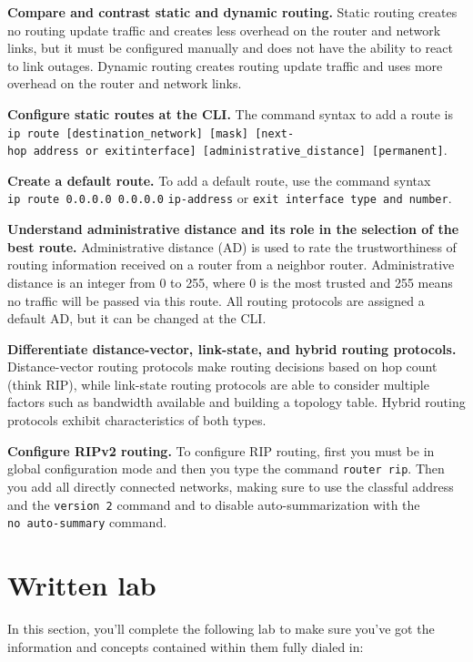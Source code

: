 \protect\hypertarget{c09.xhtmlux5cux23Page_400}{}{}\textbf{Compare and
contrast static and dynamic routing.} Static routing creates no routing
update traffic and creates less overhead on the router and network
links, but it must be configured manually and does not have the ability
to react to link outages. Dynamic routing creates routing update traffic
and uses more overhead on the router and network links.

\textbf{Configure static routes at the CLI.} The command syntax to add a
route is
\texttt{ip\ route\ {[}destination\_network{]}\ {[}mask{]}\ {[}next-hop~address\ or\ exitinterface{]}\ {[}administrative\_distance{]}\ {[}permanent{]}}.

\textbf{Create a default route.} To add a default route, use the command
syntax \texttt{ip\ route\ 0.0.0.0\ 0.0.0.0} \texttt{ip-address} or
\texttt{exit\ interface\ type\ and\ number}.

\textbf{Understand administrative distance and its role in the selection
of the best route.} Adminis­trative distance (AD) is used to rate the
trustworthiness of routing information received on a router from a
neighbor router. Administrative distance is an integer from 0 to 255,
where 0 is the most trusted and 255 means no traffic will be passed via
this route. All routing protocols are assigned a default AD, but it can
be changed at the CLI.

\textbf{Differentiate distance-vector, link-state, and hybrid routing
protocols.} Distance-vector routing protocols make routing decisions
based on hop count (think RIP), while link-state routing protocols are
able to consider multiple factors such as bandwidth available and
building a topology table. Hybrid routing protocols exhibit
characteristics of both types.

\textbf{Configure RIPv2 routing.} To configure RIP routing, first you
must be in global configuration mode and then you type the command
\texttt{router\ rip}. Then you add all directly connected networks,
making sure to use the classful address and the \texttt{version\ 2}
command and to disable auto-summarization with the
\texttt{no\ auto-summary} command.



\section{Written lab}

In this section, you'll complete the following lab to make sure you've
got the information and concepts contained within them fully dialed in:

